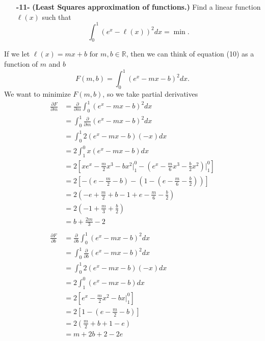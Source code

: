 \documentclass[11pt]{article}
\theoremstyle{definition}
\newcommand{\R}{\mathbb{R}}
\newcommand{\1}[1]{\mathbf{1} \left \{ #1 \right \}}
\begin{document}
\begin{itemize}
    \item[{\textbf{-11-}}] \textbf{(Least Squares approximation of functions.)}  Find a linear function $\ell(x)$ such that
    \begin{equation}
        \int_0^1 (e^x - \ell(x))^2 dx = \min.
    \end{equation}
\end{itemize}
If we let \(\ell(x) = mx+b \text{ for } m,b \in \R\), then we can think of equation (10) as a function of $m$ and $b$
\[F(m,b) = \int_0^1 (e^x - mx - b)^2 dx.\]
We want to minimize $F(m,b)$, so we take partial derivatives
\begin{equation*}
    \begin{split}
        \frac{\partial F}{\partial m} &= \frac{\partial}{\partial m} \int_0^1 (e^x - mx - b)^2 dx \\
        &= \int_0^1 \frac{\partial}{\partial m} (e^x - mx - b)^2 dx \\
        &= \int_0^1 2(e^x - mx - b)(-x)dx \\
        &= 2 \int_1^0 x(e^x - mx - b) dx \\
        &= 2 \left[xe^x - \frac{m}{2}x^3 - bx^2 \Big|_1^0 -\left(e^x - \frac{m}{6}x^3 - \frac{b}{2}x^2\right)\Big|_1^0 \right] \\
        &= 2\left[-\left(e - \frac{m}{2} - b\right) - \left(1 - \left(e - \frac{m}{6} - \frac{b}{2}\right)\right)\right] \\
        &= 2\left(-e + \frac{m}{2} + b - 1 + e - \frac{m}{6} - \frac{b}{2}\right) \\
        &= 2\left(-1 + \frac{m}{3} + \frac{b}{2}\right) \\
        &= b + \frac{2m}{3} - 2 \\ \\
        \frac{\partial F}{\partial b} &= \frac{\partial}{\partial b} \int_0^1 (e^x - mx - b)^2 dx \\
        &= \int_0^1 \frac{\partial}{\partial b} (e^x - mx - b)^2 dx \\
        &= \int_0^1 2(e^x - mx - b)(-x)dx \\
        &= 2 \int_1^0 (e^x - mx - b) dx \\
        &= 2 \left[e^x - \frac{m}{2}x^2 - bx \Big|_1^0 \right] \\
        &= 2\left[1 - \left(e - \frac{m}{2} - b\right)\right] \\
        &= 2\left(\frac{m}{2} + b + 1 - e\right) \\
        &= m + 2b + 2 - 2e
    \end{split}
\end{equation*}
\end{document}
